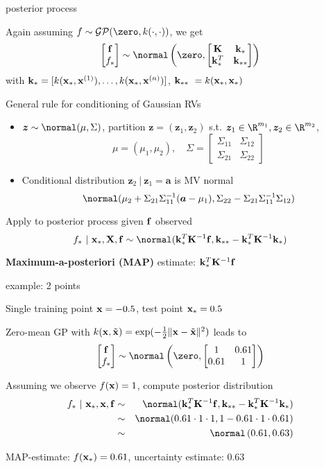 \documentclass[11pt,compress,t,notes=noshow, xcolor=table]{beamer}
\begin{document}
\begin{framei}[sep=M]{posterior process}
\item Again assuming $f \sim \gpzk$, we get
$$\begin{bmatrix}
\fv \\ f_\ast
\end{bmatrix} \sim  
\normal \left(\zero, \begin{bmatrix} \Kmat & \kstar \\ \kstar^T & \kstarstar\end{bmatrix}\right)$$
with $\kstar = [k(\xstar, \xi[1]), \dots, k(\xstar, \xi[n])]$,  $ \kstarstar\ = k(\xstar, \xstar)$
\item General rule for conditioning of Gaussian RVs
\begin{itemize}
\item $\bm{z} \sim \normal(\mu, \Sigma)$, partition $\bm{z} = (\bm{z}_1, \bm{z}_2)$ s.t. $\bm{z}_1 \in \R^{m_1}, \bm{z}_2 \in \R^{m_2}$, $$\mu = (\mu_1, \mu_2), \quad \Sigma = \begin{bmatrix} \Sigma_{11} & \Sigma_{12} \\ \Sigma_{21} & \Sigma_{22} \end{bmatrix} $$
\item Conditional distribution $\bm{z}_2 ~|~ \bm{z}_1 = \bm{a}$ is MV normal 
$$\normal(\mu_2 + \Sigma_{21} \Sigma_{11}^{-1} (\bm{a} - \mu_1), \Sigma_{22} - \Sigma_{21}\Sigma_{11}^{-1} \Sigma_{12})$$
\end{itemize}
\item Apply to posterior process given $\fv$ observed $$f_* ~|~ \xstar, \Xmat, \fv \sim \normal(\kstar^{T}\Kmatinv\fv, \kstarstar - \kstar^T \Kmat ^{-1}\kstar)$$
\item \textbf{Maximum-a-posteriori (MAP)} estimate: $\kstar^{T}\Kmatinv\fv$
\end{framei}

\begin{framei}[sep=L]{example: 2 points}
\item Single training point $\xv = -0.5$, test point $\xstar = 0.5$
\item Zero-mean GP with $k(\xv, \tilde{\xv}) = \exp(-\tfrac{1}{2} \| \xv - \tilde{\xv} \|^2)$ leads to 
$$\begin{bmatrix} \fv \\ f_* \end{bmatrix} \sim \normal\left(\zero, \begin{bmatrix} 1 & 0.61 \\ 0.61 & 1\end{bmatrix}\right)$$
\item Assuming we observe $\fx = 1$, compute posterior distribution
\begin{eqnarray*}
    f_* ~|~ \xstar, \xv, \fv &\sim& \normal(\kstar^{T}\Kmatinv \fv, \kstarstar - \kstar^T \Kmatinv\kstar) \\
    &\sim& \normal(0.61 \cdot 1 \cdot 1, 1 - 0.61 \cdot 1 \cdot 0.61) \\
    &\sim& \normal\left(0.61, 0.63\right) 
  \end{eqnarray*}
\item MAP-estimate: $f(\xstar) = 0.61$, uncertainty estimate: $0.63$
\end{framei}
\end{document}
